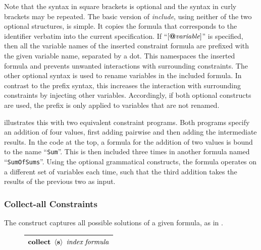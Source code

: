     \noindent
    Note that the syntax in square brackets  is optional and the syntax in curly
    brackets may be repeated.
    The basic version of {\it include}, using neither of the two optional
    structures, is simple.
    It copies the formula that corresponds to the identifier verbatim into
    the current specification.
    If ``$[\text{\bf @}\text{\it variable}]$'' is specified, then all the
    variable names of the inserted constraint formula are prefixed with the
    given variable name, separated by a dot.
    This namespaces the inserted formula and prevents unwanted
    interactions with surrounding constraints.
    The other optional syntax is used to rename variables in the included
    formula.
    In contrast to the prefix syntax, this increases the interaction with
    surrounding constraints by injecting other variables.
    Accordingly, if both optional constructs are used, the prefix is only
    applied to variables that are not renamed.

     illustrates this with two
    equivalent constraint programs.
    Both programs specify an addition of four values, first adding pairwise and
    then adding the intermediate results.
    In the code at the top, a formula for the addition of two values is
    bound to the name ``{\tt Sum}''.
    This is then included three times in another formula named
    ``{\tt SumOfSums}''.
    Using the optional grammatical constructs, the formula operates on a
    different set of variables each time, such that the third addition
    takes the results of the previous two as input.

\begin{figure}[h]

\end{figure}

\subsubsection{Collect-all Constraints}

    The  construct captures all possible solutions of a given
    formula, as in .
\begin{figure}[H]
    \centering
    \begin{tabular}{|c|}
        \hline
        $\text{\bf collect}\ \left<\text{\bf s}\right>\ \text{\it index}\ \text{\it formula}$\\
        \hline
    \end{tabular}
\end{figure}

